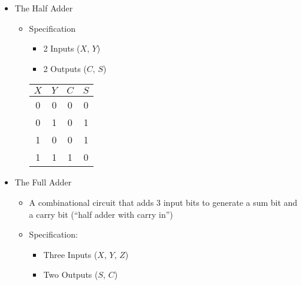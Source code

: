 \begin{itemize}

  \item The Half Adder

    \begin{itemize}

      \item Specification

        \begin{itemize}

          \item 2 Inputs ($X$, $Y$)

          \item 2 Outputs ($C$, $S$)

        \end{itemize}

        \begin{center}
          \begin{tabular}[h!]{c c | c  c}
            $X$ & $Y$ & $C$ & $S$\\
            \hline
            0 & 0 & 0 & 0\\
            0 & 1 & 0 & 1\\
            1 & 0 & 0 & 1\\
            1 & 1 & 1 & 0\\
          \end{tabular}
        \end{center}

    \end{itemize}

  \item The Full Adder

    \begin{itemize}

      \item A combinational circuit that adds 3 input bits to generate a sum bit and a carry bit (``half adder with carry in'')

      \item Specification:

        \begin{itemize}

          \item Three Inputs ($X$, $Y$, $Z$)

          \item Two Outputs ($S$, $C$)

        \end{itemize}


\end{itemize}
\end{itemize}
